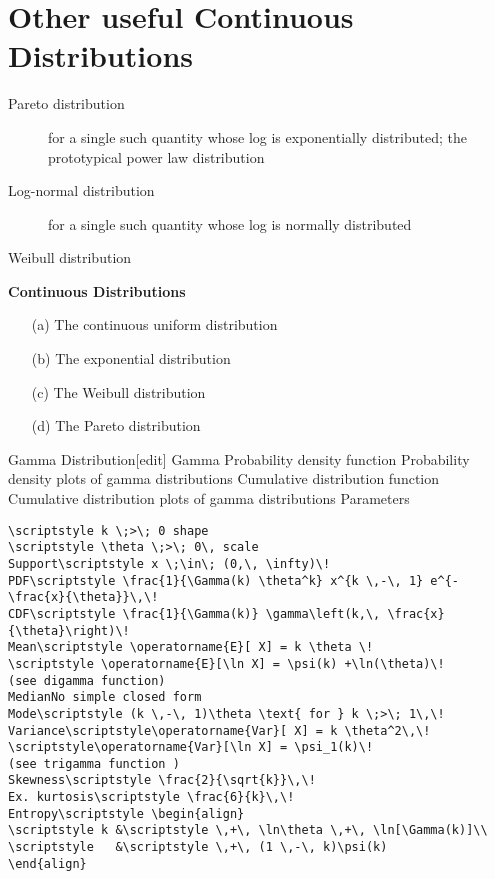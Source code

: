 \documentclass[]{report}
\begin{document}
\section{Other useful Continuous Distributions}
\begin{description}
\item [Pareto distribution] for a single such quantity whose log is exponentially distributed; 
the prototypical power law distribution
\item [Log-normal distribution] for a single such quantity whose log is normally distributed
\item [Weibull distribution]
\end{description}




\noindent \textbf{ Continuous Distributions}
\begin{multicols}{2}
\begin{itemize}
\item[(a)] The continuous uniform distribution
\item[(b)] The exponential distribution
\item[(c)] The Weibull distribution
\item[(d)] The Pareto distribution
\end{itemize}
\end{multicols}






Gamma Distribution[edit]
Gamma
Probability density function
Probability density plots of gamma distributions
Cumulative distribution function
Cumulative distribution plots of gamma distributions
Parameters

\begin{verbatim}
\scriptstyle k \;>\; 0 shape
\scriptstyle \theta \;>\; 0\, scale
Support\scriptstyle x \;\in\; (0,\, \infty)\!
PDF\scriptstyle \frac{1}{\Gamma(k) \theta^k} x^{k \,-\, 1} e^{-\frac{x}{\theta}}\,\!
CDF\scriptstyle \frac{1}{\Gamma(k)} \gamma\left(k,\, \frac{x}{\theta}\right)\!
Mean\scriptstyle \operatorname{E}[ X] = k \theta \!
\scriptstyle \operatorname{E}[\ln X] = \psi(k) +\ln(\theta)\!
(see digamma function)
MedianNo simple closed form
Mode\scriptstyle (k \,-\, 1)\theta \text{ for } k \;>\; 1\,\!
Variance\scriptstyle\operatorname{Var}[ X] = k \theta^2\,\!
\scriptstyle\operatorname{Var}[\ln X] = \psi_1(k)\!
(see trigamma function )
Skewness\scriptstyle \frac{2}{\sqrt{k}}\,\!
Ex. kurtosis\scriptstyle \frac{6}{k}\,\!
Entropy\scriptstyle \begin{align}
\scriptstyle k &\scriptstyle \,+\, \ln\theta \,+\, \ln[\Gamma(k)]\\
\scriptstyle   &\scriptstyle \,+\, (1 \,-\, k)\psi(k)
\end{align}
\end{verbatim}
\end{document}
